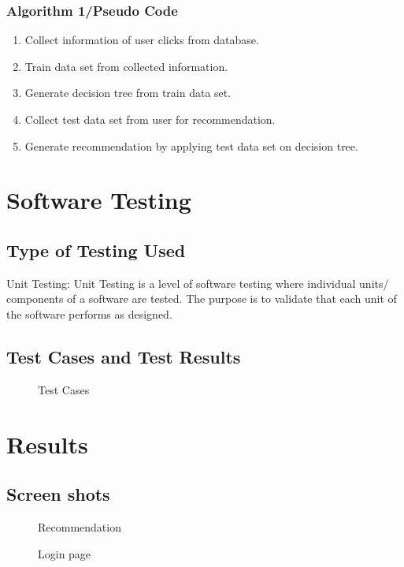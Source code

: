 \documentclass[oneside,a4paper,12pt]{book}
\begin{document}
\begin{enumerate}
\begin{itemize}
  \subsection{Algorithm 1/Pseudo Code}
  \begin{enumerate}
\item Collect information of user clicks from database.
\item Train data set from collected information.
\item Generate decision tree from train data set. 
\item Collect test data set from user for recommendation.
\item Generate recommendation by applying test data set on decision tree.
\end{enumerate}
  
  
\chapter{Software Testing}
 \section{Type of Testing Used}
   Unit Testing: Unit Testing is a level of software testing where individual units/ components of a software are tested. The purpose is to validate that
each unit of the software performs as designed.

   \section{Test Cases and Test Results}
\begin{center}
	\begin{figure}[!htbp]
		\centering
	  \caption{Test Cases}
	  \label{fig:test_cases}
	\end{figure}
\end{center}  
   
\chapter{Results}
\section{Screen shots}
\begin{center}
	\begin{figure}[!htbp]
		\centering
	  \caption{Recommendation}
	  \label{fig:Recommendation}
	\end{figure}
\end{center}
\begin{center}
	\begin{figure}[!htbp]
		\centering
	   \caption{Login page}
	  \label{fig:Login page}
	  

\end{figure}
\end{center}
\end{itemize}
\end{enumerate}
\end{document}
